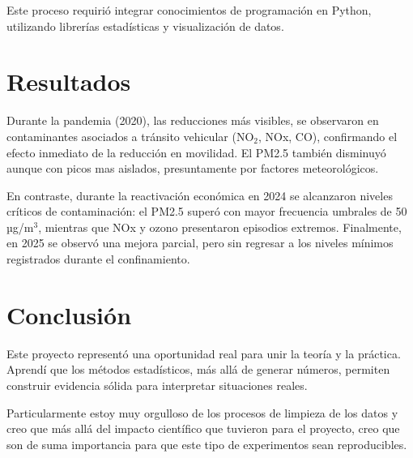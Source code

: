\documentclass[11pt]{article}
\begin{document}
    Este proceso requirió integrar conocimientos de programación en Python, utilizando librerías estadísticas y visualización de datos.

    \section*{Resultados}

    Durante la pandemia (2020), las reducciones más visibles, se observaron en contaminantes asociados a tránsito vehicular (NO$_2$, NOx, CO), confirmando el efecto inmediato de la reducción en movilidad.
    El PM2.5 también disminuyó aunque con picos mas aislados, presuntamente por factores meteorológicos.

    En contraste, durante la reactivación económica en 2024 se alcanzaron niveles críticos de contaminación: el PM2.5 superó con mayor frecuencia umbrales de 50 µg/m$^3$, mientras que NOx y ozono presentaron episodios extremos.
    Finalmente, en 2025 se observó una mejora parcial, pero sin regresar a los niveles mínimos registrados durante el confinamiento.

    \section*{Conclusión}

    Este proyecto representó una oportunidad real para unir la teoría y la práctica.
    Aprendí que los métodos estadísticos, más allá de generar números, permiten construir evidencia sólida para interpretar situaciones reales.

    Particularmente estoy muy orgulloso de los procesos de limpieza de los datos y creo que más allá del impacto científico que tuvieron para el proyecto, creo que son de suma importancia para que este tipo de experimentos sean reproducibles.
\end{document}
